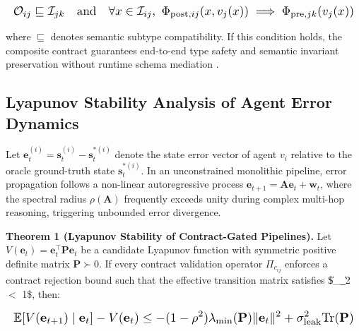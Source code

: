 \documentclass[10pt,twocolumn,letterpaper]{article}
\begin{document}
\begin{equation}
\resizebox{\columnwidth}{!}{$\displaystyle
\begin{aligned}
\mathcal{O}_{ij} \sqsubseteq \mathcal{I}_{jk} \quad \text{and} \quad \forall x \in \mathcal{I}_{ij},\ \Phi_{\text{post}, ij}(x, v_j(x)) \implies \Phi_{\text{pre}, jk}(v_j(x))
\end{aligned}
$}
\end{equation}










where $\sqsubseteq$ denotes semantic subtype compatibility. If this condition holds, the composite contract guarantees end-to-end type safety and semantic invariant preservation without runtime schema mediation \cite{crossref_10_18653_v1_2026_findings_acl_1933}.


\subsection{Lyapunov Stability Analysis of Agent Error Dynamics}


Let $\mathbf{e}_t^{(i)} = \mathbf{s}_t^{(i)} - \mathbf{s}_t^{*(i)}$ denote the state error vector of agent $v_i$ relative to the oracle ground-truth state $\mathbf{s}_t^{*(i)}$. In an unconstrained monolithic pipeline, error propagation follows a non-linear autoregressive process $\mathbf{e}_{t+1} = \mathbf{A}\mathbf{e}_t + \mathbf{w}_t$, where the spectral radius $\rho(\mathbf{A})$ frequently exceeds unity during complex multi-hop reasoning, triggering unbounded error divergence.

\textbf{Theorem 1 (Lyapunov Stability of Contract-Gated Pipelines).} Let $V(\mathbf{e}_t) = \mathbf{e}_t^\top \mathbf{P} \mathbf{e}_t$ be a candidate Lyapunov function with symmetric positive definite matrix $\mathbf{P} \succ 0$. If every contract validation operator $\Pi_{c_{ij}}$ enforces a contract rejection bound such that the effective transition matrix satisfies \$\|\_{}\|\_2 \le \rho $<$ 1\$, then:










\begin{equation}
\resizebox{\columnwidth}{!}{$\displaystyle
\begin{aligned}
\mathbb{E}[V(\mathbf{e}_{t+1}) \mid \mathbf{e}_t] - V(\mathbf{e}_t) \le -(1 - \rho^2) \lambda_{\min}(\mathbf{P}) \|\mathbf{e}_t\|^2 + \sigma_{\text{leak}}^2 \text{Tr}(\mathbf{P})
\end{aligned}
$}
\end{equation}
\end{document}
